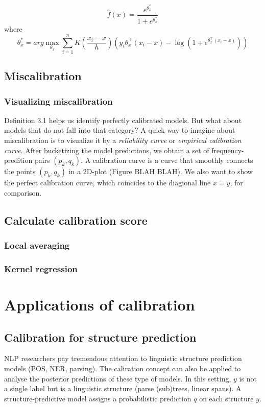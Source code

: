 $$\hat{f}(x) = \frac{e^{\theta^*_x}}{1 + e^{\theta^*_x}}$$ where 
$$\theta^*_x = arg\max_{\theta_x}\sum_{i=1}^n K\left(\frac{x_i - x}{h}\right)\left(y_i\theta_x^{\top}(x_i - x) - \log(1 + e^{\theta_x^{\top}(x_i - x)})\right)$$



\subsection{Miscalibration}

\subsubsection{Visualizing miscalibration}

Definition 3.1 helps us identify perfectly calibrated models. But what about models that do not fall into that category? A quick way to imagine about miscalibration is to visualize it by a \textit{reliability curve} or \textit{empirical calibration curve}. After bucketizing the model predictions, we obtain a set of frequency-predition pairs $(p_k, q_k)$. A calibration curve is a curve that smoothly connects the points $(p_k, q_k)$ in a 2D-plot (Figure BLAH BLAH). We also want to show the perfect calibration curve, which coincides to the diagional line $x=y$, for comparison. 

\subsection{Calculate calibration score}
\subsubsection{Local averaging}

\subsubsection{Kernel regression}

\section{Applications of calibration}

\subsection{Calibration for structure prediction}

NLP researchers pay tremendous attention to linguistic structure prediction models (POS, NER, parsing). The caliration concept can also be applied to analyse the posterior predictions of these type of models. In this setting, $y$ is not a single label but is a linguistic structure (parse (sub)trees, linear spans). A structure-predictive model assigns a probabilistic prediction $q$ on each structure $y$. 

